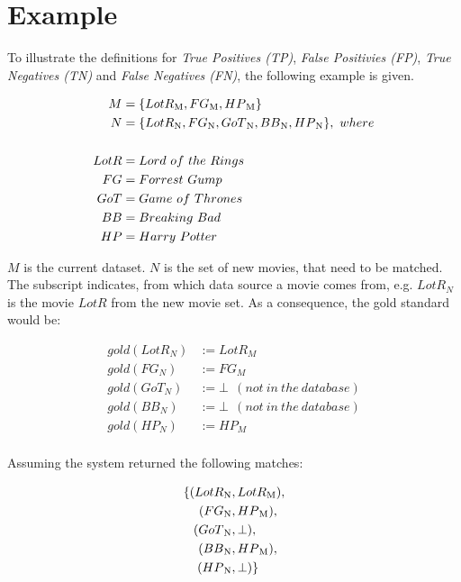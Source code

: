 
\section{Example}
\label{appendix_example}

To illustrate the definitions for \emph{True Positives (TP)}, \emph{False Positivies (FP)}, \emph{True Negatives (TN)} and \emph{False Negatives (FN)}, the following example is given.

\begin{align*}
M &= \{LotR\textsubscript{M}, FG\textsubscript{M}, HP\textsubscript{M}\} \\
N &= \{LotR\textsubscript{N}, FG\textsubscript{N}, GoT\textsubscript{N}, BB\textsubscript{N}, HP\textsubscript{N}\},~where \\
\\
LotR &= Lord~of~the~Rings \\
FG &= Forrest~Gump \\
GoT &= Game~of~Thrones \\
BB &= Breaking~Bad \\
HP &= Harry~Potter
\end{align*}

$M$ is the current dataset. $N$ is the set of new movies, that need to be matched. The subscript indicates, from which data source a movie comes from, e.g. $LotR_N$ is the movie $LotR$ from the new movie set.
As a consequence, the gold standard would be:

\begin{align*}
gold(LotR_N) &:= LotR_M \\
gold(FG_N) &:= FG_M \\
gold(GoT_N) &:= \bot~~(not~in~the~database) \\
gold(BB_N) &:= \bot~~(not~in~the~database) \\
gold(HP_N) &:= HP_M \\
\end{align*}

Assuming the system returned the following matches:

\begin{align*}
\{ (LotR\textsubscript{N}&, LotR\textsubscript{M}), \\
(FG\textsubscript{N}&, HP\textsubscript{M}), \\
(GoT\textsubscript{N}&, \mathbf{\bot}), \\
(BB\textsubscript{N}&, HP\textsubscript{M}), \\
(HP\textsubscript{N}&, \mathbf{\bot}) \} \\
\end{align*}

